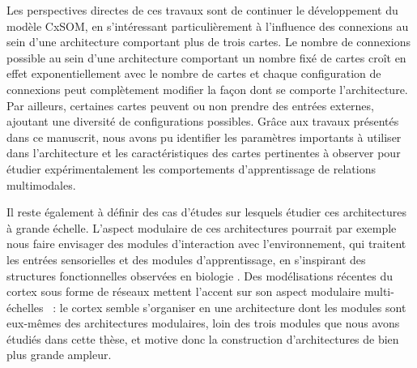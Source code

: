 Les perspectives directes de ces travaux sont de continuer le développement du modèle CxSOM, en s'intéressant particulièrement à l'influence des connexions au sein d'une architecture comportant plus de trois cartes.
Le nombre de connexions possible au sein d'une architecture comportant un nombre fixé de cartes croît en effet exponentiellement avec le nombre de cartes et chaque configuration de connexions peut complètement modifier la façon dont se comporte l'architecture. 
Par ailleurs, certaines cartes peuvent ou non prendre des entrées externes, ajoutant une diversité de configurations possibles. Grâce aux travaux présentés dans ce manuscrit, nous avons pu identifier les paramètres importants à utiliser dans l'architecture et les caractéristiques des cartes pertinentes à observer pour étudier expérimentalement les comportements d'apprentissage de relations multimodales.

Il reste également à définir des cas d'études sur lesquels étudier ces architectures à grande échelle.
L'aspect modulaire de ces architectures pourrait par exemple nous faire envisager des modules d'interaction avec l'environnement, qui traitent les entrées sensorielles et des modules d'apprentissage, en s'inspirant des structures fonctionnelles observées en biologie \parencite{Ellefsen2015NeuralMH}. 
Des modélisations récentes du cortex sous forme de réseaux mettent l'accent sur son aspect modulaire multi-échelles \parencite{betzel_multi-scale_2017}~: le cortex semble s'organiser en une architecture dont les modules sont eux-mêmes des architectures modulaires, loin des trois modules que nous avons étudiés dans cette thèse, et motive donc la construction d'architectures de bien plus grande ampleur.

